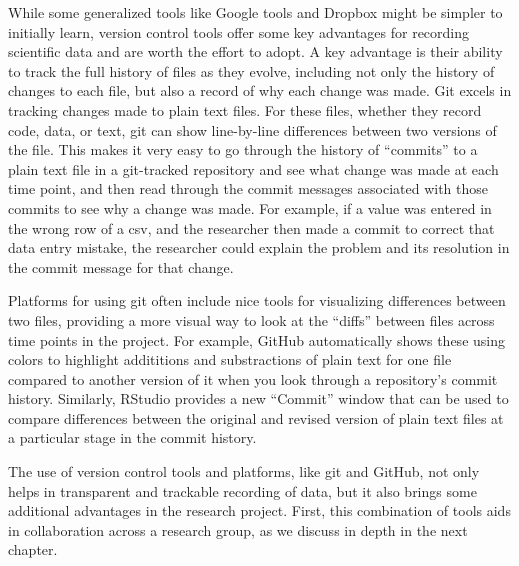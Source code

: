 \documentclass[]{tufte-book}
\begin{document}
While some generalized tools like Google tools and Dropbox might be simpler to
initially learn, version control tools offer some key advantages for recording
scientific data and are worth the effort to adopt. A key advantage is their
ability to track the full history of files as they evolve, including not only
the history of changes to each file, but also a record of why each change was
made. Git excels in tracking changes made to plain text
files. For these files, whether they record code, data, or text, git can show
line-by-line differences between two versions of the file. This makes it very
easy to go through the history of ``commits'' to a plain text file in a
git-tracked repository and see what change was made at each time point, and then
read through the commit messages associated with those commits to see why a
change was made. For example, if a value was entered in the wrong row of a csv,
and the researcher then made a commit to correct that data entry mistake, the
researcher could explain the problem and its resolution in the commit message
for that change.

Platforms for using git often include nice tools for visualizing differences
between two files, providing a more visual way to look at the ``diffs'' between
files across time points in the project. For example, GitHub automatically shows
these using colors to highlight addititions and substractions of plain text for
one file compared to another version of it when you look through a repository's
commit history. Similarly, RStudio provides a new ``Commit'' window that can be
used to compare differences between the original and revised version of plain
text files at a particular stage in the commit history.

The use of version control tools and platforms, like git and GitHub, not only
helps in transparent and trackable recording of data, but it also brings some
additional advantages in the research project. First, this combination of tools
aids in collaboration across a research group, as we discuss in depth in the next
chapter.
\end{document}
